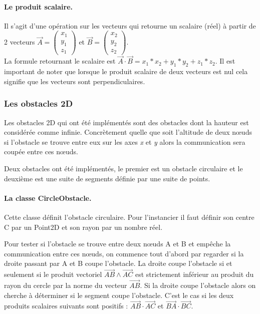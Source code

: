\documentclass{article}
\begin{document}
\paragraph{Le produit scalaire.}

Il s'agit d'une opération sur les vecteurs qui retourne un scalaire (réel) à partir de 2 vecteurs $\overrightarrow{A}=\left(\begin{array}{c}x_1 \\ y_1\\ z_1 \end{array}\right)$ et $\overrightarrow{B}=\left(\begin{array}{c}x_2 \\ y_2\\ z_2 \end{array}\right)$.\\
 La formule retournant le scalaire est $\overrightarrow{A}\cdot\overrightarrow{B}= x_1*x_2+y_1*y_2+z_1*z_2$.\medskip
Il est important de noter que lorsque le produit scalaire de deux vecteurs est nul cela signifie que les vecteurs sont perpendiculaires. 


\subsubsection{Les obstacles 2D}

Les obstacles 2D qui ont été implémentés sont des obstacles dont la hauteur est considérée comme infinie. Concrètement quelle que soit l'altitude de deux n\oe uds si l'obstacle se trouve entre eux sur les axes \emph{x} et \emph{y} alors la communication sera coupée entre ces n\oe uds.\medskip

Deux obstacles ont été implémentés, le premier est un obstacle circulaire et le deuxième est une suite de segments définie par une suite de points.

\paragraph{La classe CircleObstacle.}

Cette classe définit l'obstacle circulaire. Pour l'instancier il faut définir son centre C par un Point2D et son rayon par un nombre réel.\medskip

Pour tester si l'obstacle se trouve entre deux n\oe uds A et B et empêche la communication entre ces n\oe uds, on commence tout d'abord par regarder si la droite passant par A et B coupe l'obstacle. La droite coupe l'obstacle si et seulement si le produit vectoriel $ \overrightarrow{AB} \wedge \overrightarrow{AC}$ est strictement inférieur au produit du rayon du cercle par la norme du vecteur $\overrightarrow{AB}$. Si la droite coupe l'obstacle alors on cherche à déterminer si le segment coupe l'obstacle. C'est le cas si les deux produits scalaires suivants sont positifs : $\overrightarrow{AB}\cdot\overrightarrow{AC}$ et $\overrightarrow{BA}\cdot\overrightarrow{BC}$.\medskip
\end{document}
